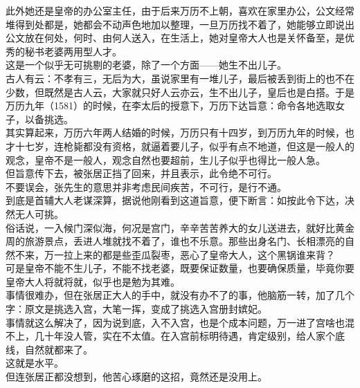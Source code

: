 \begin{multicols}{\theparacolNo}
此外她还是皇帝的办公室主任，由于后来万历不上朝，喜欢在家里办公，公文经常堆得到处都是，她都会不动声色地加以整理，一旦万历找不着了，她能够立即说出公文放在何处，何时、由何人送入，在生活上，她对皇帝大人也是关怀备至，是优秀的秘书老婆两用型人才。\\

这是一个似乎无可挑剔的老婆，除了一个方面——她生不出儿子。\\

古人有云：不孝有三，无后为大，虽说家里有一堆儿子，最后被丢到街上的也不在少数，但既然是古人云，大家就只好人云亦云，生不出儿子，皇后也是白搭。于是万历九年（1581）的时候，在李太后的授意下，万历下达旨意：命令各地选取女子，以备挑选。\\

其实算起来，万历六年两人结婚的时候，万历只有十四岁，到万历九年的时候，也才十七岁，连枪毙都没有资格，就逼着要儿子，似乎有点不地道，但这是一般人的观念，皇帝不是一般人，观念自然也要超前，生儿子似乎也得比一般人急。\\

但旨意传下去，被张居正挡了回来，并且表示，此令绝不可行。\\

不要误会，张先生的意思并非考虑民间疾苦，不可行，是行不通。\\

到底是首辅大人老谋深算，据说他刚看到这道旨意，便下断言：如按此令下达，决然无人可挑。\\

俗话说，一入候门深似海，何况是宫门，辛辛苦苦养大的女儿送进去，就好比黄金周的旅游景点，丢进人堆就找不着了，谁也不乐意。那些出身名门、长相漂亮的自然不来，万一拉上来的都是些歪瓜裂枣，恶心了皇帝大人，这个黑锅谁来背？\\

可是皇帝不能不生儿子，不能不找老婆，既要保证数量，也要确保质量，毕竟你要皇帝大人将就将就，似乎也是勉为其难。\\

事情很难办，但在张居正大人的手中，就没有办不了的事，他脑筋一转，加了几个字：原文是挑选入宫，大笔一挥，变成了挑选入宫册封嫔妃。\\

事情就这么解决了，因为说到底，入不入宫，也是个成本问题，万一进了宫啥也混不上，几十年没人管，实在不太值。在入宫前标明待遇，肯定级别，给人家个底线，自然就都来了。\\

这就是水平。\\

但连张居正都没想到，他苦心琢磨的这招，竟然还是没用上。\\


\end{multicols}
